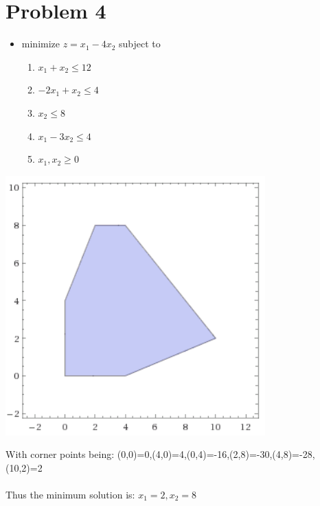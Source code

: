 \documentclass[11pt,a4paper,openany]{report}
\begin{document}
\section*{Problem 4}
\begin{itemize}
  \item minimize \(z=x_1-4x_2\) subject to
  \begin{enumerate}
    \item \(x_1+x_2\leq12\)
    \item \(-2x_1+x_2\leq4\)
    \item \(x_2\leq8\)
    \item \(x_1-3x_2\leq4\)
    \item \(x_1,x_2\geq0\)
  \end{enumerate}
\end{itemize}
\begin{center}
  \includegraphics[height=10cm]{images/p4_1}
\end{center}
With corner points being: (0,0)=0,(4,0)=4,(0,4)=-16,(2,8)=-30,(4,8)=-28,(10,2)=2\\\\
Thus the minimum solution is: \(x_1=2,x_2=8\)

\newpage
\end{document}
